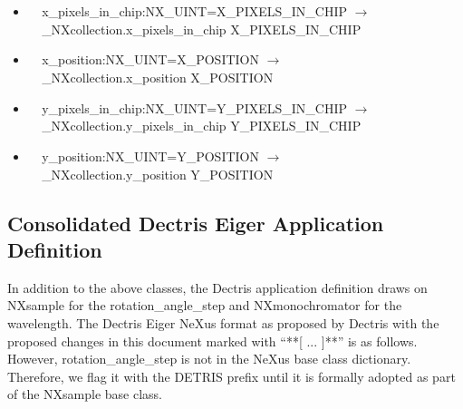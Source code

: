 \documentclass[11pt]{article}
\begin{document}
{{\begin{itemize}
\item{\verb|  |x\_pixels\_in\_chip:NX\_UINT=X\_PIXELS\_IN\_CHIP $\rightarrow$\\
\verb|  |\_NXcollection.x\_pixels\_in\_chip X\_PIXELS\_IN\_CHIP}

\item{\verb|  |x\_position:NX\_UINT=X\_POSITION $\rightarrow$\\
\verb|  |\_NXcollection.x\_position X\_POSITION}

\item{\verb|  |y\_pixels\_in\_chip:NX\_UINT=Y\_PIXELS\_IN\_CHIP $\rightarrow$\\
\verb|  |\_NXcollection.y\_pixels\_in\_chip Y\_PIXELS\_IN\_CHIP}

\item{\verb|  |y\_position:NX\_UINT=Y\_POSITION $\rightarrow$\\
\verb|  |\_NXcollection.y\_position Y\_POSITION}
\end{itemize}

\subsection{Consolidated Dectris Eiger Application Definition}

In addition to the above classes, the Dectris application definition draws
on NXsample for the rotation\_angle\_step and NXmonochromator for the wavelength.
The Dectris Eiger NeXus format as proposed by Dectris with the proposed changes
in this document marked with ``**[ ... ]**'' is as follows.  However,
rotation\_angle\_step is not in the NeXus base class dictionary.  Therefore,
we flag it with the DETRIS prefix until it is formally adopted as part of
the NXsample base class.

}}
\end{document}
